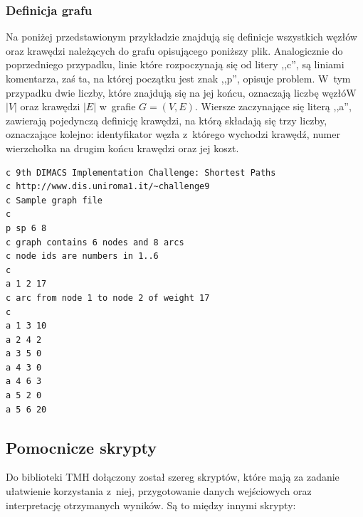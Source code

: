 \vspace{1em} %
\subsubsection{Definicja grafu}


Na poniżej przedstawionym przykładzie znajdują się definicje wszystkich węzłów oraz krawędzi należących do grafu opisującego poniższy plik.
Analogicznie do poprzedniego przypadku, linie które rozpoczynają się od litery ,,c'', są liniami komentarza, zaś ta, na której początku jest znak ,,p'', opisuje problem.
W~tym przypadku dwie liczby, które znajdują się na jej końcu, oznaczają liczbę węzłóW~$\left| V \right|$ oraz krawędzi $\left| E \right|$ w~grafie $G = \left( V, E \right)$.
Wiersze zaczynające się literą ,,a'', zawierają pojedynczą definicję krawędzi, na którą składają się trzy liczby, oznaczające kolejno: identyfikator węzła z~którego wychodzi krawędź, numer wierzchołka na drugim końcu krawędzi oraz jej koszt.

\small
\begin{lstlisting}[language=bash]
c 9th DIMACS Implementation Challenge: Shortest Paths
c http://www.dis.uniroma1.it/~challenge9
c Sample graph file
c
p sp 6 8
c graph contains 6 nodes and 8 arcs
c node ids are numbers in 1..6
c
a 1 2 17
c arc from node 1 to node 2 of weight 17
c
a 1 3 10
a 2 4 2
a 3 5 0
a 4 3 0
a 4 6 3
a 5 2 0
a 5 6 20

\end{lstlisting}
\normalsize



\subsection{Pomocnicze skrypty}



Do biblioteki \textsc{TMH} dołączony został szereg skryptów, które mają za zadanie ułatwienie korzystania z~niej, przygotowanie danych wejściowych oraz interpretację otrzymanych wyników.
Są to między innymi skrypty:

\newpage

